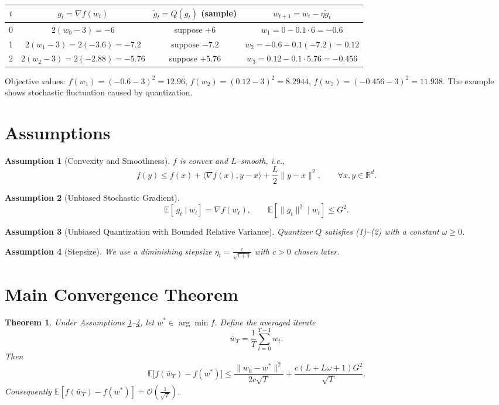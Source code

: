\documentclass{article}
\newtheorem{theorem}{Theorem}
\newtheorem{assumption}{Assumption}
\begin{document}
\begin{center}
\begin{tabular}{c|c|c|c}
$t$ & $g_t=\nabla f(w_t)$ & $\tilde g_t=Q(g_t)$ (sample) & $w_{t+1}=w_t-\eta\tilde g_t$ \\ \hline
0 & $2(w_0-3)=-6$ & suppose $+6$ & $w_1=0-0.1\cdot6=-0.6$ \\
1 & $2(w_1-3)=2(-3.6)=-7.2$ & suppose $-7.2$ & $w_2=-0.6-0.1(-7.2)=0.12$ \\
2 & $2(w_2-3)=2(-2.88)=-5.76$ & suppose $+5.76$ & $w_3=0.12-0.1\cdot5.76=-0.456$
\end{tabular}
\end{center}
Objective values: $f(w_1)=(-0.6-3)^2=12.96$, $f(w_2)= (0.12-3)^2=8.2944$, $f(w_3)=(-0.456-3)^2=11.938$.
The example shows stochastic fluctuation caused by quantization.

\newpage
\section*{Assumptions}
\begin{assumption}[Convexity and Smoothness]\label{ass:convex}
$f$ is convex and $L$–smooth, i.e.,
\[
f(y)\le f(x)+\langle\nabla f(x),y-x\rangle+\frac{L}{2}\|y-x\|^2,\qquad\forall x,y\in\mathbb{R}^d .
\]
\end{assumption}
\begin{assumption}[Unbiased Stochastic Gradient]\label{ass:sgd}
\[
\mathbb{E}[\,g_t\mid w_t]=\nabla f(w_t),\qquad 
\mathbb{E}[\|g_t\|^2\mid w_t]\le G^2 .
\]
\end{assumption}
\begin{assumption}[Unbiased Quantization with Bounded Relative Variance]\label{ass:quant}
Quantizer $Q$ satisfies (1)–(2) with a constant $\omega\ge0$.
\end{assumption}
\begin{assumption}[Stepsize]\label{ass:stepsize}
We use a diminishing stepsize $\eta_t=\frac{c}{\sqrt{t+1}}$ with $c>0$ chosen later.
\end{assumption}

\section*{Main Convergence Theorem}
\begin{theorem}\label{thm:main}
Under Assumptions \ref{ass:convex}–\ref{ass:stepsize}, let $w^*\in\arg\min f$.  Define the averaged iterate 
\[
\bar w_T=\frac{1}{T}\sum_{t=0}^{T-1} w_t .
\]
Then
\[
\boxed{\mathbb{E}\bigl[f(\bar w_T)-f(w^*)\bigr]\le
\frac{\|w_0-w^*\|^2}{2c\sqrt{T}}+\frac{c(L+L\omega+1)G^2}{\sqrt{T}} } .
\]
Consequently $\mathbb{E}[f(\bar w_T)-f(w^*)]=\mathcal{O}\!\left(\tfrac{1}{\sqrt{T}}\right)$.
\end{theorem}
\end{document}
